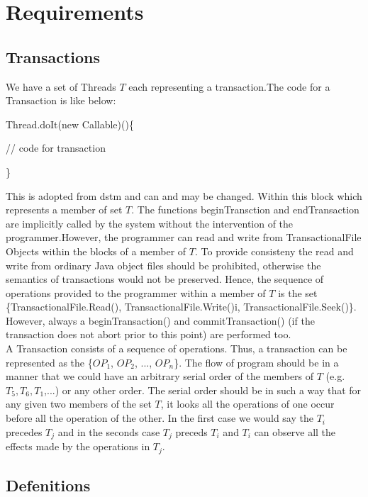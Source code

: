 \documentclass[a4paper, 11pt]{article}
\begin{document}
\section{Requirements}
\subsection{Transactions}
We have a set of Threads $T$ each representing a transaction.The code for a 
Transaction is like below:

\hspace{12mm}	Thread.doIt(new Callable)()\{

\hspace{12mm}		// code for transaction

\hspace{12mm}	\}

This is adopted from dstm and can and may be changed. Within this block which 
represents a member of set $T$. The functions beginTransction and endTransaction are implicitly called by the system without the intervention of the programmer.However, the programmer can read and write from TransactionalFile Objects within the blocks of a member of $T$. To provide consisteny the read and write from ordinary Java object files should be prohibited, otherwise the semantics of transactions would not be preserved. Hence, the sequence of operations provided to the programmer within a member of $T$ is the set \{TransactionalFile.Read(), TransactionalFile.Write()i, TransactionalFile.Seek()\}. However, always a beginTransaction() and commitTransaction() (if the transaction does not abort prior to this point) are performed too. \\ 

A Transaction consists of a sequence of operations. Thus, a transaction can be represented as the \{$OP_1$, $OP_2$, ..., $OP_n$\}. The flow of program should be in a manner that we could have an arbitrary serial order of the members of $T$ (e.g. $T_5,T_6,T_1$,...) or any other order. The serial order should be in such a way that for any given two members of the set $T$, it looks all the operations of one occur before all the operation of the other. In the first case we would say the $T_i$ precedes $T_j$ and in the seconds case $T_j$ preceds $T_i$ and $T_i$ can observe all the effects made by the operations in $T_j$. \\

\subsection{Defenitions}
\end{document}

